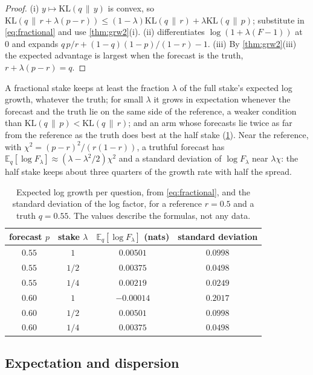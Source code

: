 \documentclass[11pt]{article}
\theoremstyle{plain}
\theoremstyle{definition}
\theoremstyle{remark}
\newcommand{\KL}[2]{\mathrm{KL}(#1\,\|\,#2)}
\newcommand{\E}{\mathbb{E}}
\begin{document}
\begin{proof}
(i) $y\mapsto\KL{q}{y}$ is convex, so
$\KL{q}{r+\lambda(p-r)}\le(1-\lambda)\KL{q}{r}+\lambda\KL{q}{p}$; substitute in
\eqref{eq:fractional} and use \cref{thm:grw2}(i). (ii) differentiates $\log(1+\lambda(F-1))$ at $0$
and expands $q\,p/r+(1-q)(1-p)/(1-r)-1$. (iii) By
\cref{thm:grw2}(iii) the expected advantage is largest when the forecast is the truth,
$r+\lambda(p-r)=q$.
\end{proof}

A fractional stake keeps at least the fraction $\lambda$ of the full stake's expected log growth,
whatever the truth; for small $\lambda$ it grows in expectation whenever the forecast and the truth
lie on the same side of the reference, a weaker condition than $\KL{q}{p}<\KL{q}{r}$; and an arm
whose forecasts lie twice as far from the reference as the truth does best at the half stake
(\cref{tab:fraction}). Near the reference, with $\chi^2=(p-r)^2/(r(1-r))$, a truthful forecast has
$\E_q[\log F_\lambda]\approx(\lambda-\lambda^2/2)\chi^2$ and a standard deviation of
$\log F_\lambda$ near $\lambda\chi$: the half stake keeps about three quarters of the growth rate
with half the spread.

\begin{table}[t]
\centering
\caption{Expected log growth per question, from \eqref{eq:fractional}, and the standard deviation
of the log factor, for a reference $r=0.5$ and a truth $q=0.55$. The values describe the formulas,
not any data.}
\label{tab:fraction}
\small
\begin{tabular}{cccc}
\toprule
forecast $p$ & stake $\lambda$ & $\E_q[\log F_\lambda]$ (nats) & standard deviation \\
\midrule
$0.55$ & $1$   & $0.00501$  & $0.0998$ \\
$0.55$ & $1/2$ & $0.00375$  & $0.0498$ \\
$0.55$ & $1/4$ & $0.00219$  & $0.0249$ \\
$0.60$ & $1$   & $-0.00014$ & $0.2017$ \\
$0.60$ & $1/2$ & $0.00501$  & $0.0998$ \\
$0.60$ & $1/4$ & $0.00375$  & $0.0498$ \\
\bottomrule
\end{tabular}
\end{table}

\subsection{Expectation and dispersion}
\label{sec:dispersion}
\end{document}
